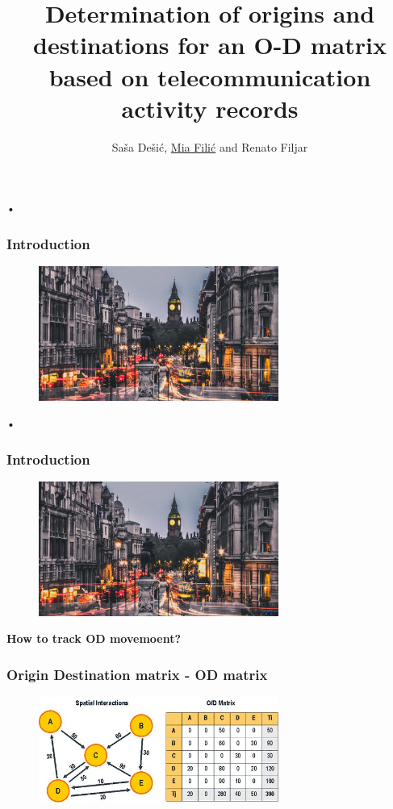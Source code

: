 \documentclass[11pt]{beamer}
\author{Saša Dešić, \underline{Mia Filić} and Renato Filjar}
\title{Determination of origins and destinations
for an O-D matrix based on telecommunication activity records}
\date{}
\begin{document}
\begin{frame}
\titlepage
\end{frame}

\begin{frame}{•}
	\frametitle{Introduction}
	\begin{figure}
      \centering
    \includegraphics[width=0.7\textwidth]{first}
    
  \end{figure}

\end{frame}

\begin{frame}{•}
	\frametitle{Introduction}
	\begin{figure}
      \centering
    \includegraphics[width=0.7\textwidth]{first}
    
  \end{figure}
  \textbf{How to track OD movemoent?}
\end{frame}

\begin{frame}
   \frametitle{Origin Destination matrix - OD matrix}
   \begin{figure}
      \centering
    \includegraphics[width=0.7\textwidth]{Odgraph}
    
    \end{figure}

\end{frame}
\end{document}

